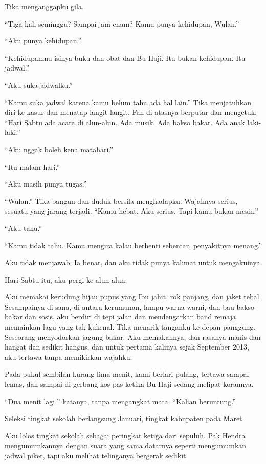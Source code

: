 \documentclass[11pt,twoside,openany]{book}
\makeatletter
\newcommand{\scenebreak}{\par\vspace{0.9em}{\centering\textsc{*\hspace{0.7em}*\hspace{0.7em}*}\par}\vspace{0.9em}\@afterindentfalse\@afterheading}
\makeatother
\begin{document}
\scenebreak
Tika menganggapku gila.

``Tiga kali seminggu? Sampai jam enam? Kamu punya kehidupan, Wulan.''

``Aku punya kehidupan.''

``Kehidupanmu isinya buku dan obat dan Bu Haji. Itu bukan kehidupan. Itu jadwal.''

``Aku suka jadwalku.''

``Kamu suka jadwal karena kamu belum tahu ada hal lain.'' Tika menjatuhkan diri ke kasur dan menatap langit-langit. Fan di atasnya berputar dan mengetuk. ``Hari Sabtu ada acara di alun-alun. Ada musik. Ada bakso bakar. Ada anak laki-laki.''

``Aku nggak boleh kena matahari.''

``Itu malam hari.''

``Aku masih punya tugas.''

``Wulan.'' Tika bangun dan duduk bersila menghadapku. Wajahnya serius, sesuatu yang jarang terjadi. ``Kamu hebat. Aku serius. Tapi kamu bukan mesin.''

``Aku tahu.''

``Kamu tidak tahu. Kamu mengira kalau berhenti sebentar, penyakitnya menang.''

Aku tidak menjawab. Ia benar, dan aku tidak punya kalimat untuk mengakuinya.

Hari Sabtu itu, aku pergi ke alun-alun.

Aku memakai kerudung hijau pupus yang Ibu jahit, rok panjang, dan jaket tebal. Sesampainya di sana, di antara kerumunan, lampu warna-warni, dan bau bakso bakar dan sosis, aku berdiri di tepi jalan dan mendengarkan band remaja memainkan lagu yang tak kukenal. Tika menarik tanganku ke depan panggung. Seseorang menyodorkan jagung bakar. Aku memakannya, dan rasanya manis dan hangat dan sedikit hangus, dan untuk pertama kalinya sejak September 2013, aku tertawa tanpa memikirkan wajahku.

Pada pukul sembilan kurang lima menit, kami berlari pulang, tertawa sampai lemas, dan sampai di gerbang kos pas ketika Bu Haji sedang melipat korannya.

``Dua menit lagi,'' katanya, tanpa mengangkat mata. ``Kalian beruntung.''

\scenebreak
Seleksi tingkat sekolah berlangsung Januari, tingkat kabupaten pada Maret.

Aku lolos tingkat sekolah sebagai peringkat ketiga dari sepuluh. Pak Hendra mengumumkannya dengan suara yang sama datarnya seperti mengumumkan jadwal piket, tapi aku melihat telinganya bergerak sedikit.
\end{document}
